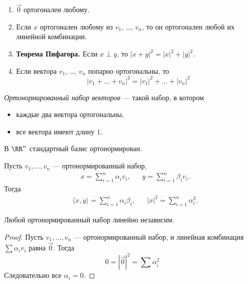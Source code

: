 \documentclass[12pt,a4paper]{article}
\begin{document}
    \begin{lemma}
        \begin{enumerate}
            \item $\vec{0}$ ортогонален любому.
            \item Если $x$ ортогонален любому из $v_1$, \dots, $v_n$, то он ортогонален любой их линейной комбинации.
            \item \textbf{Теорема Пифагора.} Если $x \perp y$, то $|x + y|^2 = |x|^2 + |y|^2$.
            \item Если вектора $v_1$, \dots, $v_n$ попарно ортогональны, то
                \[|v_1 + \dots + v_n|^2 = |v_1|^2 + \dots + |v_n|^2\]
        \end{enumerate}
    \end{lemma}

    \begin{definition}
        \emph{Ортонормированный набор векторов} --- такой набор, в котором
        \begin{itemize}
            \item каждые два вектора ортогональны,
            \item все вектора имеют длину $1$.
        \end{itemize}
    \end{definition}

    \begin{example}
        В $\RR^n$ стандартный базис ортонормирован.
    \end{example}

    \begin{lemma}
        Пусть $v_1, \dots, v_n$ --- ортонормированный набор,
        \begin{align*}
            &x = \sum_{i=1}^n \alpha_i v_i,&
            &y = \sum_{i=1}^n \beta_i v_i.
        \end{align*}
        Тогда
        \begin{align*}
            &\langle x, y \rangle = \sum_{i=1}^n \alpha_i \beta_i,&
            &|x|^2 = \sum_{i=1}^n \alpha_i^2.
        \end{align*}
    \end{lemma}

    \begin{theorem}
        Любой ортонормированный набор линейно независим.
    \end{theorem}

    \begin{proof}
        Пусть $v_1, \dots, v_n$ --- ортонормированный набор, и линейная комбинация $\sum \alpha_i v_i$ равна $\vec{0}$. Тогда
        \[0 = |\vec{0}|^2 = \sum \alpha_i^2\]
        Следовательно все $\alpha_i = 0$.
    \end{proof}
\end{document}
